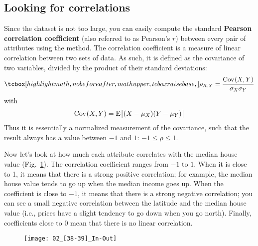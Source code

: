 \subsection{Looking for correlations}
Since the dataset is not too large, you can easily compute the standard \textbf{Pearson correlation coefficient} (also referred to as Pearson's $r$) between every pair of attributes using the  method. The correlation coefficient is a measure of linear correlation between two sets of data. As such, it is defined as the covariance of two variables, divided by the product of their standard deviations:
\begin{equation}
\tcbhighmath{\rho_{X,Y}=\frac{\operatorname{Cov}\s(X,Y)}{\sigma_X\sigma_Y}}
\end{equation}
with
\begin{equation}
\operatorname{Cov}\mspace{1mu}(X,Y)=\operatorname{E}\bigl[(X-\mu_X)(Y-\mu_Y)\bigr]
\end{equation}
Thus it is essentially a normalized measurement of the covariance, such that the result always has a value between $-1$ and $1$: $-1\leq\rho\leq1$.

Now let's look at how much each attribute correlates with the median house value (Fig.~\ref{02_[38-39]_In-Out}). The correlation coefficient ranges from $-1$ to $1$. When it is close to 1, it means that there is a strong positive correlation; for example, the median house value tends to go up when the median income goes up. When the coefficient is close to $-1$, it means that there is a strong negative correlation; you can see a small negative correlation between the latitude and the median house value (i.e., prices have a slight tendency to go down when you go north). Finally, coefficients close to 0 mean that there is no linear correlation.
\begin{figure}[h!t]
\centering
\texttt{[image: 02\_[38-39]\_In-Out]}
\caption{}\label{02_[38-39]_In-Out}
\end{figure}

